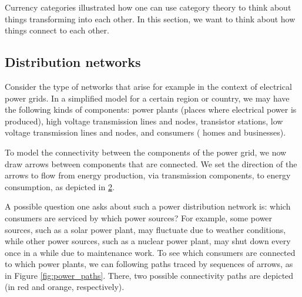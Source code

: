 
Currency categories illustrated how one can use category theory to think about things transforming into each other. In this section, we want to think about how things connect to each other.

\subsection{Distribution networks}

Consider the type of networks that arise for example in the context of electrical power grids. In a simplified model for a certain region or country, we may have the following kinds of components: power plants (places where electrical power is produced), high voltage transmission lines and nodes, transistor stations, low voltage transmission lines and nodes, and consumers ( homes and businesses).

\begin{figure}[h!]
\centering
 \caption{}
\label{fig:power_nodes}
\end{figure}
To model the connectivity between the components of the power grid, we now draw arrows between components that are connected. We set the direction of the arrows to flow from energy production, via transmission components, to energy consumption, as depicted in \cref{fig:power_nodes_connected}.
\begin{figure}[h!]
\centering
{}
 \caption{}
\label{fig:power_nodes_connected}
\end{figure}


A possible question one asks about such a power distribution network is: which consumers are serviced by which power sources? For example, some power sources, such as a solar power plant, may fluctuate due to weather conditions, while other power sources, such as a nuclear power plant, may shut down every once in a while due to maintenance work. To see which consumers are connected to which power plants, we can following paths traced by sequences of arrows, as in Figure \cref{fig:power_paths}. There, two possible connectivity paths are depicted (in red and orange, respectively).


